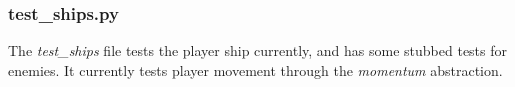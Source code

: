     \subsubsection*{test\_ships.py}
        The \textit{test\_ships} file tests the player ship currently, and
        has some stubbed tests for enemies.  It currently tests player
        movement through the \textit{momentum} abstraction.
        \inputminted{python}{../assets/test_ships.py}


